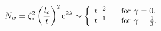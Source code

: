 \begin{equation}
N_w
   =    \zeta^2_\ast
        \left( \frac{l_c}{t}
        \right)^2 \mathrm{e}^{2\lambda}
   \sim \left\{ 
               \begin{array}{ll}
                 t^{-2} & \textrm{\,\,\, for } \gamma=0, \\
                 t^{-1} & \textrm{\,\,\, for } \gamma=\frac{1}{3}.
               \end{array} 
         \right.
\label{eq:scaling_decay}
\end{equation}


